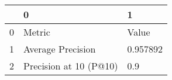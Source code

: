 \begin{tabular}{lll}
\toprule
{} &                       0 &         1 \\
\midrule
0 &                  Metric &     Value \\
1 &       Average Precision &  0.957892 \\
2 &  Precision at 10 (P@10) &       0.9 \\
\bottomrule
\end{tabular}
